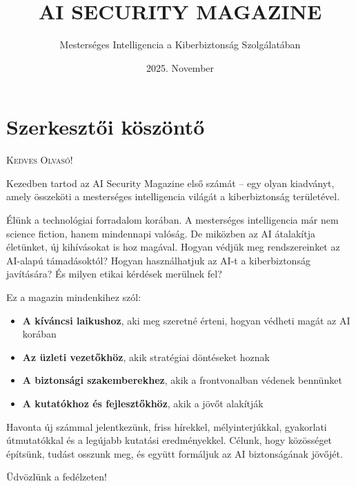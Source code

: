 \documentclass{../templates/magazine}
\title{AI SECURITY MAGAZINE}
\subtitle{Mesterséges Intelligencia a Kiberbiztonság Szolgálatában}
\date{2025. November}
\begin{document}
\maketitle

\thispagestyle{empty}
\section*{Szerkesztői köszöntő}

\lettrine{K}{edves Olvasó!}

Kezedben tartod az AI Security Magazine első számát -- egy olyan kiadványt, amely összeköti a mesterséges intelligencia világát a kiberbiztonság területével.

\vspace{0.5cm}

Élünk a technológiai forradalom korában. A mesterséges intelligencia már nem science fiction, hanem mindennapi valóság. De miközben az AI átalakítja életünket, új kihívásokat is hoz magával. Hogyan védjük meg rendszereinket az AI-alapú támadásoktól? Hogyan használhatjuk az AI-t a kiberbiztonság javítására? És milyen etikai kérdések merülnek fel?

\vspace{0.5cm}

Ez a magazin mindenkihez szól:
\begin{itemize}[leftmargin=1.5cm]
    \item \textbf{A kíváncsi laikushoz}, aki meg szeretné érteni, hogyan védheti magát az AI korában
    \item \textbf{Az üzleti vezetőkhöz}, akik stratégiai döntéseket hoznak
    \item \textbf{A biztonsági szakemberekhez}, akik a frontvonalban védenek bennünket
    \item \textbf{A kutatókhoz és fejlesztőkhöz}, akik a jövőt alakítják
\end{itemize}

\vspace{0.5cm}

Havonta új számmal jelentkezünk, friss hírekkel, mélyinterjúkkal, gyakorlati útmutatókkal és a legújabb kutatási eredményekkel. Célunk, hogy közösséget építsünk, tudást osszunk meg, és együtt formáljuk az AI biztonságának jövőjét.

\vspace{0.5cm}

Üdvözlünk a fedélzeten!

\vspace{0.5cm}
\end{document}
